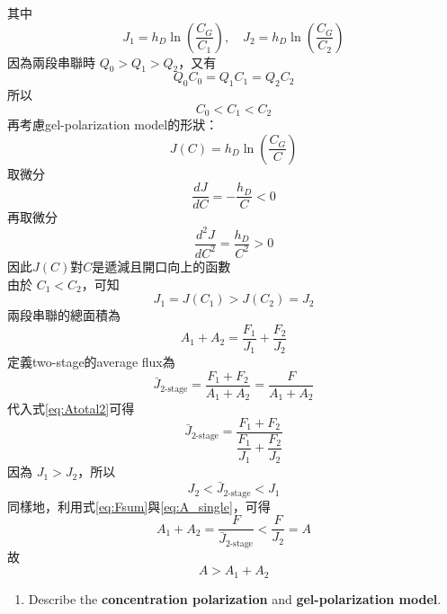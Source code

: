 ﻿\documentclass[12pt,a4paper]{article}
\begin{document}
\begin{problems}
其中
\begin{equation}
  J_1 = h_D\ln\left(\frac{C_G}{C_1}\right),
  \quad
  J_2 = h_D\ln\left(\frac{C_G}{C_2}\right)
\end{equation}
因為兩段串聯時 $Q_0 > Q_1 > Q_2$，又有
\begin{equation}
  Q_0C_0 = Q_1C_1 = Q_2C_2
\end{equation}
所以
\begin{equation}
  C_0 < C_1 < C_2
\end{equation}
再考慮gel-polarization model的形狀：
\begin{equation}
  J(C)=h_D\ln\left(\frac{C_G}{C}\right)
\end{equation}
取微分
\begin{equation}
  \frac{dJ}{dC} = -\frac{h_D}{C} < 0
\end{equation}
再取微分
\begin{equation}
  \frac{d^2J}{dC^2} = \frac{h_D}{C^2} > 0
\end{equation}
因此$J(C)$對$C$是遞減且開口向上的函數\\
由於 $C_1 < C_2$，可知
\begin{equation}
  J_1 = J(C_1) > J(C_2)=J_2
  \label{eq:J1gtJ2}
\end{equation}
兩段串聯的總面積為
\begin{equation}
  A_1 + A_2 = \frac{F_1}{J_1} + \frac{F_2}{J_2}
  \label{eq:Atotal2}
\end{equation}
定義two-stage的average flux為
\begin{equation}
  \bar J_{\text{2-stage}} = \frac{F_1+F_2}{A_1+A_2}
  = \frac{F}{A_1+A_2}
\end{equation}
代入式\eqref{eq:Atotal2}可得
\begin{equation}
  \bar J_{\text{2-stage}}
  = \frac{F_1+F_2}{\dfrac{F_1}{J_1}+\dfrac{F_2}{J_2}}
\end{equation}
因為 $J_1>J_2$，所以
\begin{equation}
  J_2 < \bar J_{\text{2-stage}} < J_1
\end{equation}
同樣地，利用式\eqref{eq:Fsum}與\eqref{eq:A_single}，可得
\begin{equation}
  A_1+A_2
  = \frac{F}{\bar J_{\text{2-stage}}}
  < \frac{F}{J_2}
  = A
\end{equation}
故
\begin{equation}
  \boxed{A > A_1 + A_2}
\end{equation}
\begin{enumerate}
\item Describe the \textbf{concentration polarization} and \textbf{gel-polarization model}.\\

\end{enumerate}
\end{problems}
\end{document}
